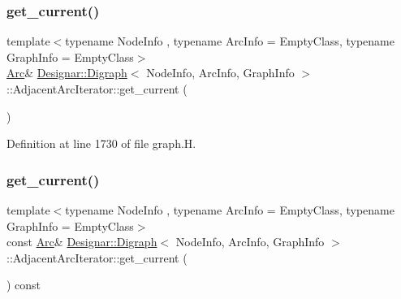 \subsubsection{\texorpdfstring{get\+\_\+current()}{get\_current()}\hspace{0.1cm}{\footnotesize\ttfamily [1/2]}}
{\footnotesize\ttfamily template$<$typename Node\+Info , typename Arc\+Info  = Empty\+Class, typename Graph\+Info  = Empty\+Class$>$ \\
\hyperlink{class_designar_1_1_digraph_a0ceb278671f2a535c00fddccdeafd69f}{Arc}\& \hyperlink{class_designar_1_1_digraph}{Designar\+::\+Digraph}$<$ Node\+Info, Arc\+Info, Graph\+Info $>$\+::Adjacent\+Arc\+Iterator\+::get\+\_\+current (\begin{DoxyParamCaption}{ }\end{DoxyParamCaption})\hspace{0.3cm}{\ttfamily [inline]}}



Definition at line 1730 of file graph.\+H.

\mbox{\label{class_designar_1_1_digraph_1_1_adjacent_arc_iterator_ac388275a16db45fc754a193766c215ce}} 
\subsubsection{\texorpdfstring{get\+\_\+current()}{get\_current()}\hspace{0.1cm}{\footnotesize\ttfamily [2/2]}}
{\footnotesize\ttfamily template$<$typename Node\+Info , typename Arc\+Info  = Empty\+Class, typename Graph\+Info  = Empty\+Class$>$ \\
const \hyperlink{class_designar_1_1_digraph_a0ceb278671f2a535c00fddccdeafd69f}{Arc}\& \hyperlink{class_designar_1_1_digraph}{Designar\+::\+Digraph}$<$ Node\+Info, Arc\+Info, Graph\+Info $>$\+::Adjacent\+Arc\+Iterator\+::get\+\_\+current (\begin{DoxyParamCaption}{ }\end{DoxyParamCaption}) const\hspace{0.3cm}{\ttfamily [inline]}}




